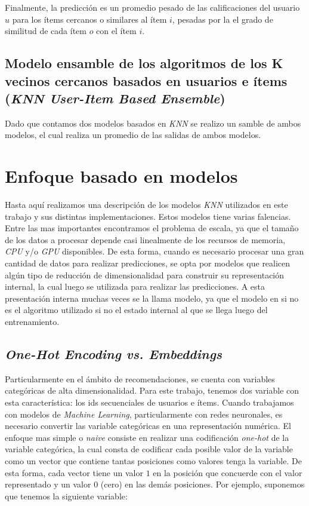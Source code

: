 \documentclass[11pt,a4paper,twoside]{thesis}
\begin{document}
Finalmente, la predicción es un promedio pesado de las calificaciones del
usuario $u$ para los ítems cercanos o similares al ítem $i$, pesadas por la el
grado de similitud de cada ítem $o$ con el ítem $i$.

\subsection{Modelo ensamble de los algoritmos de los K vecinos cercanos basados
	en usuarios e ítems (\textit{KNN User-Item Based Ensemble})}

Dado que contamos dos modelos basados en \textit{KNN} se realizo un samble de
ambos modelos, el cual realiza un promedio de las salidas de ambos modelos.

\section{Enfoque basado en modelos}

Hasta aquí realizamos una descripción de los modelos \textit{KNN} utilizados en
este trabajo y sus distintas implementaciones. Estos modelos tiene varias
falencias. Entre las mas importantes encontramos el problema de escala, ya que
el tamaño de los datos a procesar depende casi linealmente de los recursos de
memoria, \textit{CPU} y/o \textit{GPU} disponibles. De esta forma, cuando es
necesario procesar una gran cantidad de datos para realizar predicciones, se
opta por modelos que realicen algún tipo de reducción de dimensionalidad para
construir su representación internal, la cual luego se utilizada para realizar
las predicciones. A esta presentación interna muchas veces se la llama modelo,
ya que el modelo en si no es el algoritmo utilizado si no el estado internal al
que se llega luego del entrenamiento.

\subsection{\textit{One-Hot Encoding vs. Embeddings}}

Particularmente en el ámbito de recomendaciones, se cuenta con variables
categóricas de alta dimensionalidad. Para este trabajo, tenemos dos variable
con esta característica: los ids secuenciales de usuarios e ítems. Cuando
trabajamos con modelos de \textit{Machine Learning}, particularmente con redes
neuronales, es necesario convertir las variable categóricas en una
representación numérica. El enfoque mas simple o \textit{naive} consiste en
realizar una codificación \textit{one-hot} de la variable categórica, la cual
consta de codificar cada posible valor de la variable como un vector que
contiene tantas posiciones como valores tenga la variable. De esta forma, cada
vector tiene un valor $1$ en la posición que concuerde con el valor
representado y un valor $0$ (cero) en las demás posiciones. Por ejemplo,
suponemos que tenemos la siguiente variable:
\end{document}
